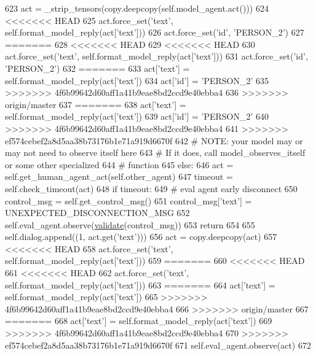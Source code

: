 \begin{DoxyCode}
623                 act = \_strip\_tensors(copy.deepcopy(self.model\_agent.act()))
624 <<<<<<< HEAD
625                 act.force\_set(\textcolor{stringliteral}{'text'}, self.format\_model\_reply(act[\textcolor{stringliteral}{'text'}]))
626                 act.force\_set(\textcolor{stringliteral}{'id'}, \textcolor{stringliteral}{'PERSON\_2'})
627 =======
628 <<<<<<< HEAD
629 <<<<<<< HEAD
630                 act.force\_set(\textcolor{stringliteral}{'text'}, self.format\_model\_reply(act[\textcolor{stringliteral}{'text'}]))
631                 act.force\_set(\textcolor{stringliteral}{'id'}, \textcolor{stringliteral}{'PERSON\_2'})
632 =======
633                 act[\textcolor{stringliteral}{'text'}] = self.format\_model\_reply(act[\textcolor{stringliteral}{'text'}])
634                 act[\textcolor{stringliteral}{'id'}] = \textcolor{stringliteral}{'PERSON\_2'}
635 >>>>>>> 4f6b99642d60aff1a41b9eae8bd2ccd9e40ebba4
636 >>>>>>> origin/master
637 =======
638                 act[\textcolor{stringliteral}{'text'}] = self.format\_model\_reply(act[\textcolor{stringliteral}{'text'}])
639                 act[\textcolor{stringliteral}{'id'}] = \textcolor{stringliteral}{'PERSON\_2'}
640 >>>>>>> 4f6b99642d60aff1a41b9eae8bd2ccd9e40ebba4
641 >>>>>>> ef574cebef2a8d5aa38b73176b1e71a919d6670f
642                 \textcolor{comment}{# NOTE: your model may or may not need to observe itself here}
643                 \textcolor{comment}{# If it does, call model\_observes\_itself or some other specialized}
644                 \textcolor{comment}{# function}
645             \textcolor{keywordflow}{else}:
646                 act = self.get\_human\_agent\_act(self.other\_agent)
647                 timeout = self.check\_timeout(act)
648                 \textcolor{keywordflow}{if} timeout:
649                     \textcolor{comment}{# eval agent early disconnect}
650                     control\_msg = self.get\_control\_msg()
651                     control\_msg[\textcolor{stringliteral}{'text'}] = UNEXPECTED\_DISCONNECTION\_MSG
652                     self.eval\_agent.observe(\hyperlink{namespaceparlai_1_1core_1_1worlds_afc3fad603b7bce41dbdc9cdc04a9c794}{validate}(control\_msg))
653                     \textcolor{keywordflow}{return}
654 
655             self.dialog.append((1, act.get(\textcolor{stringliteral}{'text'})))
656             act = copy.deepcopy(act)
657 <<<<<<< HEAD
658             act.force\_set(\textcolor{stringliteral}{'text'}, self.format\_model\_reply(act[\textcolor{stringliteral}{'text'}]))
659 =======
660 <<<<<<< HEAD
661 <<<<<<< HEAD
662             act.force\_set(\textcolor{stringliteral}{'text'}, self.format\_model\_reply(act[\textcolor{stringliteral}{'text'}]))
663 =======
664             act[\textcolor{stringliteral}{'text'}] = self.format\_model\_reply(act[\textcolor{stringliteral}{'text'}])
665 >>>>>>> 4f6b99642d60aff1a41b9eae8bd2ccd9e40ebba4
666 >>>>>>> origin/master
667 =======
668             act[\textcolor{stringliteral}{'text'}] = self.format\_model\_reply(act[\textcolor{stringliteral}{'text'}])
669 >>>>>>> 4f6b99642d60aff1a41b9eae8bd2ccd9e40ebba4
670 >>>>>>> ef574cebef2a8d5aa38b73176b1e71a919d6670f
671             self.eval\_agent.observe(act)
672 
\end{DoxyCode}
